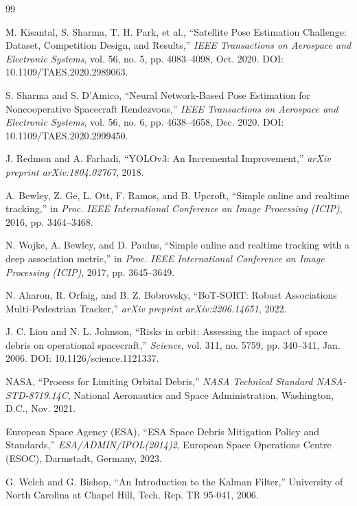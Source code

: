 \documentclass[12pt]{report}
\begin{document}
\begin{thebibliography}{99}

M. Kisantal, S. Sharma, T. H. Park, et al., ``Satellite Pose Estimation Challenge: Dataset, Competition Design, and Results,'' \emph{IEEE Transactions on Aerospace and Electronic Systems}, vol. 56, no. 5, pp. 4083--4098, Oct. 2020. DOI: 10.1109/TAES.2020.2989063.

S. Sharma and S. D'Amico, ``Neural Network-Based Pose Estimation for Noncooperative Spacecraft Rendezvous,'' \emph{IEEE Transactions on Aerospace and Electronic Systems}, vol. 56, no. 6, pp. 4638--4658, Dec. 2020. DOI: 10.1109/TAES.2020.2999450.

J. Redmon and A. Farhadi, ``YOLOv3: An Incremental Improvement,'' \emph{arXiv preprint arXiv:1804.02767}, 2018.

A. Bewley, Z. Ge, L. Ott, F. Ramos, and B. Upcroft, ``Simple online and realtime tracking,'' in \emph{Proc. IEEE International Conference on Image Processing (ICIP)}, 2016, pp. 3464--3468.

N. Wojke, A. Bewley, and D. Paulus, ``Simple online and realtime tracking with a deep association metric,'' in \emph{Proc. IEEE International Conference on Image Processing (ICIP)}, 2017, pp. 3645--3649.

N. Aharon, R. Orfaig, and B. Z. Bobrovsky, ``BoT-SORT: Robust Associations Multi-Pedestrian Tracker,'' \emph{arXiv preprint arXiv:2206.14651}, 2022.

J. C. Liou and N. L. Johnson, ``Risks in orbit: Assessing the impact of space debris on operational spacecraft,'' \emph{Science}, vol. 311, no. 5759, pp. 340--341, Jan. 2006. DOI: 10.1126/science.1121337.

NASA, ``Process for Limiting Orbital Debris,'' \emph{NASA Technical Standard NASA-STD-8719.14C}, National Aeronautics and Space Administration, Washington, D.C., Nov. 2021.

European Space Agency (ESA), ``ESA Space Debris Mitigation Policy and Standards,'' \emph{ESA/ADMIN/IPOL(2014)2}, European Space Operations Centre (ESOC), Darmstadt, Germany, 2023.

G. Welch and G. Bishop, ``An Introduction to the Kalman Filter,'' University of North Carolina at Chapel Hill, Tech. Rep. TR 95-041, 2006.


\end{thebibliography}
\end{document}
